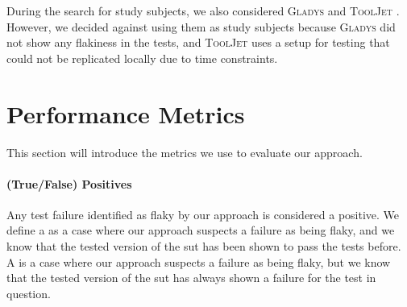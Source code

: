 During the search for study subjects, we also considered \textsc{Gladys} \autocite{noauthor_gladys_2023} and \textsc{ToolJet} \autocite{noauthor_tooljettooljet_2023}. However, we decided against using them as study subjects because \textsc{Gladys} did not show any flakiness in the tests, and \textsc{ToolJet} uses a setup for testing that could not be replicated locally due to time constraints.

\section{Performance Metrics}
This section will introduce the metrics we use to evaluate our approach.

\paragraph{(True/False) Positives} Any test failure identified as flaky by our approach is considered a positive.
We define a  as a case where our approach suspects a failure as being flaky, and we know that the tested version of the \ac{sut} has been shown to pass the tests before.
A  is a case where our approach suspects a failure as being flaky, but we know that the tested version of the \ac{sut} has always shown a failure for the test in question.

